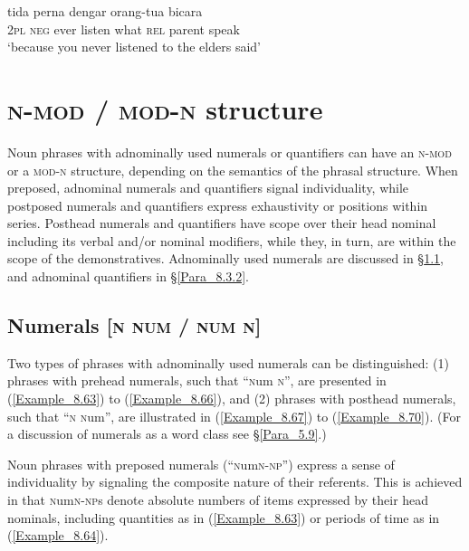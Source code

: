\ea
\label{Example_8.62}
 {tida} {perna} {dengar} {} {} {orang-tua} {bicara}\\ %
 \textsc{2pl}  \textsc{neg}  ever  listen  what  \textsc{rel}  parent  speak\\
\glt
‘because you never listened to  the elders said’ \textstyleExampleSource{[081115-001a-Cv.0338]}
\z


\section[{\footnotesize N-MOD}/{\footnotesize MOD-N} structure]{\textsc{n-mod} / \textsc{mod-n} structure}
\label{Para_8.3}
Noun phrases with adnominally used numerals or quantifiers can have an \textsc{n-mod} or a \textsc{mod-n} structure, depending on the semantics of the phrasal structure. When preposed, adnominal numerals and quantifiers signal individuality, while postposed numerals and quantifiers express exhaustivity or positions within series. Posthead numerals and quantifiers have scope over their head nominal including its verbal and/or nominal modifiers, while they, in turn, are within the scope of the demonstratives. Adnominally used numerals are discussed in §\ref{Para_8.3.1}, and adnominal quantifiers in §\ref{Para_8.3.2}.


\subsection{Numerals [\textsc{n} \textsc{num} / \textsc{num} \textsc{n}]}
\label{Para_8.3.1}
Two types of  phrases with adnominally used numerals can be distinguished: (1)  phrases with prehead numerals, such that ``\textsc{n}um \textsc{n}'', are presented in (\ref{Example_8.63}) to (\ref{Example_8.66}), and (2)  phrases with posthead numerals, such that ``\textsc{n} \textsc{n}um'', are illustrated in (\ref{Example_8.67}) to (\ref{Example_8.70}). (For a discussion of numerals as a word class see §\ref{Para_5.9}.)



Noun phrases with preposed numerals (``\textsc{n}um\textsc{n-np}'') express a sense of individuality by signaling the composite nature of their referents. This is achieved in that \textsc{n}um\textsc{n-np}s denote absolute numbers of items expressed by their head nominals, including quantities as in (\ref{Example_8.63}) or periods of time as in (\ref{Example_8.64}).



